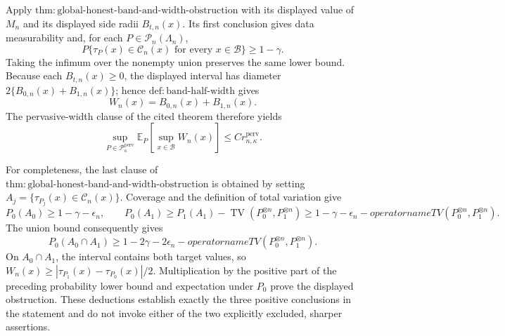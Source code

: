 Apply \(\mathrm{thm:global\text{-}honest\text{-}band\text{-}and\text{-}width\text{-}obstruction}\) with its displayed value of \(M_n\) and its displayed side radii \(B_{t,n}(x)\).  Its first conclusion gives data measurability and, for each \(P\in\mathcal P_n(\Lambda_n)\),
\[
P\{\tau_P(x)\in\mathcal C_n(x)\text{ for every }x\in\mathcal B\}\ge1-\gamma.
\]
Taking the infimum over the nonempty union preserves the same lower bound.  Because each \(B_{t,n}(x)\ge0\), the displayed interval has diameter \(2\{B_{0,n}(x)+B_{1,n}(x)\}\); hence \(\mathrm{def:band\text{-}half\text{-}width}\) gives
\[
W_n(x)=B_{0,n}(x)+B_{1,n}(x).
\]
The pervasive-width clause of the cited theorem therefore yields
\[
\sup_{P\in\mathcal P_{\kappa}^{\mathrm{perv}}}
\mathbb E_P\left[\sup_{x\in\mathcal B}W_n(x)\right]
\le C r_{n,\kappa}^{\mathrm{perv}}.
\]

For completeness, the last clause of \(\mathrm{thm:global\text{-}honest\text{-}band\text{-}and\text{-}width\text{-}obstruction}\) is obtained by setting \(A_j=\{\tau_{P_j}(x)\in\mathcal C_n(x)\}\).  Coverage and the definition of total variation give
\[
P_0(A_0)\ge1-\gamma-\epsilon_n,
\qquad
P_0(A_1)\ge P_1(A_1)-\operatorname{TV}(P_0^{\otimes n},P_1^{\otimes n})
\ge1-\gamma-\epsilon_n-operatorname{TV}(P_0^{\otimes n},P_1^{\otimes n}).
\]
The union bound consequently gives
\[
P_0(A_0\cap A_1)
\ge1-2\gamma-2\epsilon_n-operatorname{TV}(P_0^{\otimes n},P_1^{\otimes n}).
\]
On \(A_0\cap A_1\), the interval contains both target values, so \(W_n(x)\ge|\tau_{P_1}(x)-\tau_{P_0}(x)|/2\).  Multiplication by the positive part of the preceding probability lower bound and expectation under \(P_0\) prove the displayed obstruction.  These deductions establish exactly the three positive conclusions in the statement and do not invoke either of the two explicitly excluded, sharper assertions.